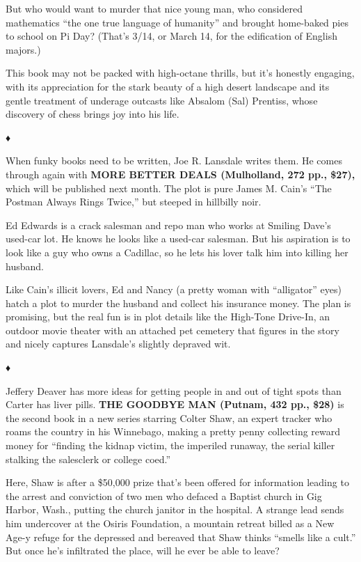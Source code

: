 But who would want to murder that nice young man, who considered
mathematics ``the one true language of humanity'' and brought home-baked
pies to school on Pi Day? (That's 3/14, or March 14, for the edification
of English majors.)

This book may not be packed with high-octane thrills, but it's honestly
engaging, with its appreciation for the stark beauty of a high desert
landscape and its gentle treatment of underage outcasts like Absalom
(Sal) Prentiss, whose discovery of chess brings joy into his life.

♦

When funky books need to be written, Joe R. Lansdale writes them. He
comes through again with \textbf{MORE BETTER DEALS (Mulholland, 272 pp.,
\$27),} which will be published next month. The plot is pure James M.
Cain's ``The Postman Always Rings Twice,'' but steeped in hillbilly
noir.

Ed Edwards is a crack salesman and repo man who works at Smiling Dave's
used-car lot. He knows he looks like a used-car salesman. But his
aspiration is to look like a guy who owns a Cadillac, so he lets his
lover talk him into killing her husband.

Like Cain's illicit lovers, Ed and Nancy (a pretty woman with
``alligator'' eyes) hatch a plot to murder the husband and collect his
insurance money. The plan is promising, but the real fun is in plot
details like the High-Tone Drive-In, an outdoor movie theater with an
attached pet cemetery that figures in the story and nicely captures
Lansdale's slightly depraved wit.

♦

Jeffery Deaver has more ideas for getting people in and out of tight
spots than Carter has liver pills. \textbf{THE GOODBYE MAN (Putnam, 432
pp., \$28)} is the second book in a new series starring Colter Shaw, an
expert tracker who roams the country in his Winnebago, making a pretty
penny collecting reward money for ``finding the kidnap victim, the
imperiled runaway, the serial killer stalking the salesclerk or college
coed.''

Here, Shaw is after a \$50,000 prize that's been offered for information
leading to the arrest and conviction of two men who defaced a Baptist
church in Gig Harbor, Wash., putting the church janitor in the hospital.
A strange lead sends him undercover at the Osiris Foundation, a mountain
retreat billed as a New Age-y refuge for the depressed and bereaved that
Shaw thinks ``smells like a cult.'' But once he's infiltrated the place,
will he ever be able to leave?

